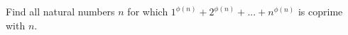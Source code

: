Find all natural numbers $n$ for which $1^{\phi (n)} + 2^{\phi (n)} +... + n^{\phi (n)}$ is coprime with $n$.